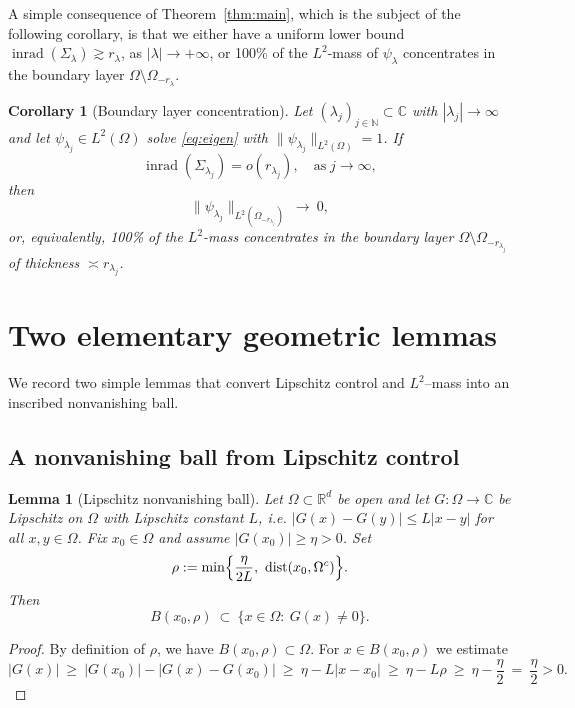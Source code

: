 \documentclass[12pt, reqno]{amsart}
\theoremstyle{plain}
\newtheorem{lem}[thm]{Lemma}
\newtheorem{cor}[thm]{Corollary}
\theoremstyle{remark}
\newcommand{\C}{\mathbb{C}}
\newcommand{\R}{\mathbb{R}}
\newcommand{\N}{\mathbb{N}}
\newcommand{\inrad}{\operatorname{inrad}}
\newcommand{\dist}{\operatorname{dist}}
\begin{document}
A simple consequence of Theorem~\ref{thm:main}, which is the subject of the following corollary, is that we either have a uniform lower bound $\inrad(\Sigma_{\lambda})\gtrsim r_\lambda$, as $|\lambda|\to+\infty$, or 100\% of the $L^2$-mass of $\psi_\lambda$ concentrates in the boundary layer $\Omega\setminus\Omega_{-r_\lambda}$.
\begin{cor}[Boundary layer concentration]\label{cor:boundary-layer}
Let $(\lambda_j)_{j\in\N}\subset\C$ with $|\lambda_j|\to\infty$ and let $\psi_{\lambda_j}\in L^2(\Omega)$ solve \eqref{eq:eigen} with $\|\psi_{\lambda_j}\|_{L^2(\Omega)} = 1$.
If
$$
\inrad(\Sigma_{\lambda_j}) = o(r_{\lambda_j}),\quad \text{as}\;j\to\infty,
$$
then
$$
\|\psi_{\lambda_j}\|_{L^2(\Omega_{-r_{\lambda_j}})}\ \longrightarrow\ 0,
$$
or, equivalently, 100\% of the $L^2$-mass concentrates in the boundary layer
$\Omega\setminus\Omega_{-r_{\lambda_j}}$ of thickness $\asymp r_{\lambda_j}$.
\end{cor}


\section{Two elementary geometric lemmas}

We record two simple lemmas that convert Lipschitz control and $L^2$--mass into an inscribed nonvanishing ball.

\subsection{A nonvanishing ball from Lipschitz control}

\begin{lem}[Lipschitz nonvanishing ball]\label{lem:lipschitz-ball}
Let $\Omega\subset\R^d$ be open and let $G:\Omega\to\C$ be Lipschitz on $\Omega$ with Lipschitz constant $L$, i.e.
$|G(x)-G(y)|\le L|x-y|$ for all $x,y\in\Omega$.
Fix $x_0\in\Omega$ and assume $|G(x_0)|\ge \eta>0$.
Set
$$
\rho := \min\Bigl\{\frac{\eta}{2L},\ \dist(x_0,\Omega^c)\Bigr\}.
$$
Then
$$
B(x_0,\rho)\ \subset\ \{x\in\Omega:\ G(x)\neq 0\}.
$$
\end{lem}

\begin{proof}
By definition of $\rho$, we have $B(x_0,\rho)\subset\Omega$.
For $x\in B(x_0,\rho)$ we estimate
$$
|G(x)|\ \ge\ |G(x_0)|-|G(x)-G(x_0)|
\ \ge\ \eta-L|x-x_0|
\ \ge\ \eta-L\rho
\ \ge\ \eta-\frac{\eta}{2}\ = \ \frac{\eta}{2}>0.
$$
\end{proof}
\end{document}
